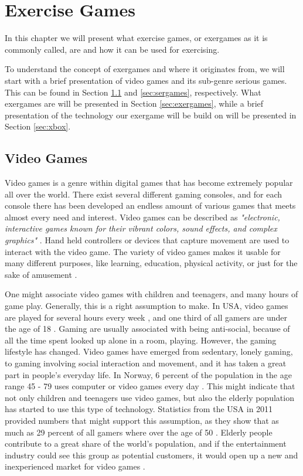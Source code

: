 \chapter{Exercise Games}
\label{chap:exergames}
In this chapter we will present what exercise games, or exergames as it is commonly called, are and how it can be used for exercising.  

To understand the concept of exergames and where it originates from, we will start with a brief presentation of video games and its sub-genre serious games. This can be found in Section \ref{sec:videogamess} and \ref{sec:sergames}, respectively.  What exergames are will be presented in Section \ref{sec:exergames}, while a brief presentation of the technology our exergame will be build on will be presented in Section \ref{sec:xbox}.
\section{Video Games}
\label{sec:videogamess}

Video games is a genre within digital games that has become extremely popular all over the world. There exist several different gaming consoles, and for each console there has been developed an endless amount of various games that meets almost every need and interest. Video games can be described as \emph{"electronic, interactive games known for their vibrant colors, sound effects, and complex graphics"} \cite{videogamedef}. Hand held controllers or devices that capture movement are used to interact with the video game. The variety of video games makes it usable for many different purposes, like learning, education, physical activity, or just for the sake of amusement \cite{project}. 

One might associate video games with children and teenagers, and many hours of game play. Generally, this is a right assumption to make. In USA, video games are played for several hours every week \cite{foxnews}, and one third of all gamers are under the age of 18 \cite{videogames2012}. Gaming are usually associated with being anti-social, because of all the time spent looked up alone in a room, playing. However, the gaming lifestyle has changed. Video games have emerged from sedentary, lonely gaming, to gaming involving social interaction and movement, and it has taken a great part in people's everyday life. In Norway, 6 percent of the population in the age range 45 - 79 uses computer or video games every day \cite{mediebarometer2012}. This might indicate that not only children and teenagers use video games, but also the elderly population has started to use this type of technology. Statistics from the USA in 2011 provided numbers that might support this assumption, as they show that as much as 29 percent of all gamers where over the age of 50 \cite{videogames2011}. Elderly people contribute to a great share of the world's population, and if the entertainment industry could see this group as potential customers, it would open up a new and inexperienced market for video games \cite{ijsselsteijn2007digital}. 

